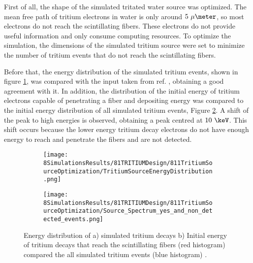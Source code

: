 First of all, the shape of the simulated tritated water source was optimized. The mean free path of tritium electrons in water is only around $5~\mu\meter$, so most electrons do not reach the scintillating fibers. These electrons do not provide useful information and only consume computing resources. To optimize the simulation, the dimensions of the simulated tritium source were set to minimize the number of tritium events that do not reach the scintillating fibers. 

Before that, the energy distribution of the simulated tritium events, shown in figure \ref{subfig:EnergyDistributionTritiumSource}, was compared with the input taken from ref. \cite{TritiumEmissionSpectrum}, obtaining a good agreement with it. In addition, the distribution of the initial energy of tritium electrons capable of penetrating a fiber and depositing energy was compared to the initial energy distribution of all simulated tritium events, Figure \ref{subfig:EnergySpectrumEventsDetectedandNonDetected}. A shift of the peak to high energies is observed, obtaining a peak centred at $10~\keV$. This shift occurs because the lower energy tritium decay electrons do not have enough energy to reach and penetrate the fibers and are not detected.

\begin{figure}
\centering
    \begin{subfigure}[b]{0.45\textwidth}
    \centering
    \texttt{[image: 8SimulationsResults/81TRITIUMDesign/811TritiumSourceOptimization/TritiumSourceEnergyDistribution.png]}  
    \caption{\label{subfig:EnergyDistributionTritiumSource}}
    \end{subfigure}
    \hfill
    \begin{subfigure}[b]{0.45\textwidth}
    \centering
    \texttt{[image: 8SimulationsResults/81TRITIUMDesign/811TritiumSourceOptimization/Source\_Spectrum\_yes\_and\_non\_detected\_events.png]}  
    \caption{\label{subfig:EnergySpectrumEventsDetectedandNonDetected}}
    \end{subfigure}
 \caption{Energy distribution of a) simulated tritium decays b) Initial energy of tritium decays that reach the scintillating fibers (red histogram) compared the all simulated tritium events (blue histogram) \cite{SimulationPaperCarlos}.
 \label{fig:TritiumSourceOptimization}}
\end{figure}

